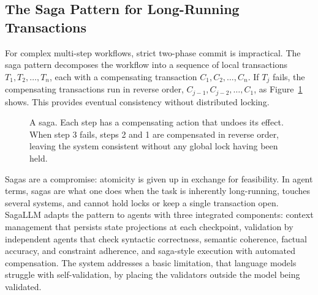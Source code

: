 \documentclass[11pt]{book}
\begin{document}
\subsection{The Saga Pattern for Long-Running Transactions}

For complex multi-step workflows, strict two-phase commit is impractical. The saga pattern \cite{garciamolina1987sagas} decomposes the workflow into a sequence of local transactions $T_1, T_2, \ldots, T_n$, each with a compensating transaction $C_1, C_2, \ldots, C_n$. If $T_j$ fails, the compensating transactions run in reverse order, $C_{j-1}, C_{j-2}, \ldots, C_1$, as Figure~\ref{fig:saga} shows. This provides eventual consistency without distributed locking.

\begin{figure}[htbp]
\centering
{}
\caption{A saga. Each step has a compensating action that undoes its effect. When step 3 fails, steps 2 and 1 are compensated in reverse order, leaving the system consistent without any global lock having been held.}
\label{fig:saga}
\end{figure}

Sagas are a compromise: atomicity is given up in exchange for feasibility. In agent terms, sagas are what one does when the task is inherently long-running, touches several systems, and cannot hold locks or keep a single transaction open. SagaLLM \cite{chang2025sagallm} adapts the pattern to agents with three integrated components: context management that persists state projections at each checkpoint, validation by independent agents that check syntactic correctness, semantic coherence, factual accuracy, and constraint adherence, and saga-style execution with automated compensation. The system addresses a basic limitation, that language models struggle with self-validation, by placing the validators outside the model being validated.
\end{document}
